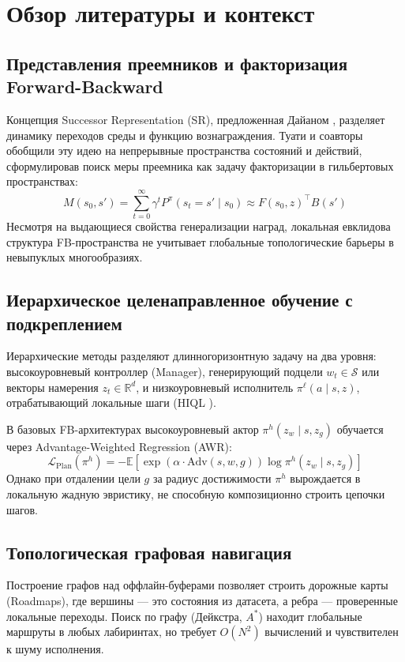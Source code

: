 \section{Обзор литературы и контекст}

\subsection{Представления преемников и факторизация Forward-Backward}
Концепция Successor Representation (SR), предложенная Дайаном \cite{dayan1993improving}, разделяет динамику переходов среды и функцию вознаграждения. Туати и соавторы \cite{touati2021learning} обобщили эту идею на непрерывные пространства состояний и действий, сформулировав поиск меры преемника как задачу факторизации в гильбертовых пространствах:
\begin{equation}
    M(s_0, s') = \sum_{t=0}^\infty \gamma^t P^\pi(s_t = s' \mid s_0) \approx F(s_0, z)^\top B(s')
\end{equation}
Несмотря на выдающиеся свойства генерализации наград, локальная евклидова структура FB-пространства не учитывает глобальные топологические барьеры в невыпуклых многообразиях.

\subsection{Иерархическое целенаправленное обучение с подкреплением}
Иерархические методы разделяют длинногоризонтную задачу на два уровня: высокоуровневый контроллер (Manager), генерирующий подцели $w_t \in \mathcal{S}$ или векторы намерения $z_t \in \mathbb{R}^d$, и низкоуровневый исполнитель $\pi^\ell(a \mid s, z)$, отрабатывающий локальные шаги (HIQL \cite{park2023hiql}). 

В базовых FB-архитектурах высокоуровневый актор $\pi^h(z_w \mid s, z_g)$ обучается через Advantage-Weighted Regression (AWR):
\begin{equation}
    \mathcal{L}_{\text{Plan}}(\pi^h) = -\mathbb{E}\left[\exp\left(\alpha \cdot \text{Adv}(s, w, g)\right) \log \pi^h(z_w \mid s, z_g)\right]
\end{equation}
Однако при отдалении цели $g$ за радиус достижимости $\pi^h$ вырождается в локальную жадную эвристику, не способную композиционно строить цепочки шагов.

\subsection{Топологическая графовая навигация}
Построение графов над оффлайн-буферами позволяет строить дорожные карты (Roadmaps), где вершины — это состояния из датасета, а ребра — проверенные локальные переходы. Поиск по графу (Дейкстра, $A^*$) находит глобальные маршруты в любых лабиринтах, но требует $O(N^2)$ вычислений и чувствителен к шуму исполнения.

